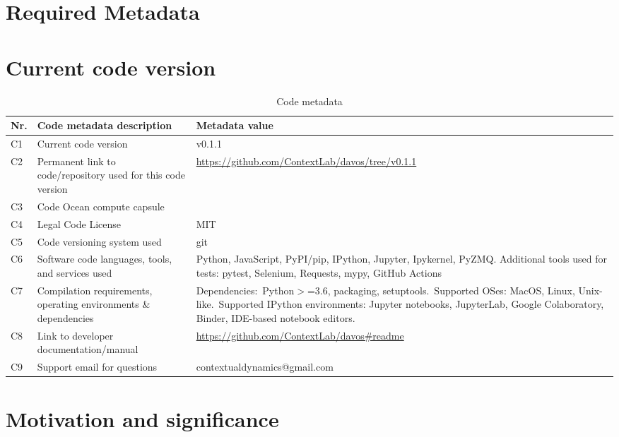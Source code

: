 \documentclass[preprint,12pt, a4paper]{elsarticle}
\begin{document}
\section*{Required Metadata}

\section*{Current code version}


\begin{table}[H]
\begin{tabular}{|l|p{6.5cm}|p{6.5cm}|}
\hline
\textbf{Nr.} & \textbf{Code metadata description} & \textbf{Metadata value} \\
\hline
C1 & Current code version &  v0.1.1 \\
\hline
C2 & Permanent link to code/repository used for this code version & \url{https://github.com/ContextLab/davos/tree/v0.1.1} \\
\hline
C3 & Code Ocean compute capsule & \\
\hline
C4 & Legal Code License & MIT \\
\hline
C5 & Code versioning system used & git \\
\hline
C6 & Software code languages, tools, and services used & Python, JavaScript, PyPI/pip, IPython, Jupyter, Ipykernel, PyZMQ. Additional tools used for tests: pytest, Selenium, Requests, mypy, GitHub Actions \\
\hline
C7 & Compilation requirements, operating environments \& dependencies & Dependencies:~Python$>$=3.6, packaging, setuptools.~Supported OSes: MacOS, Linux, Unix-like.~Supported IPython environments: Jupyter notebooks, JupyterLab, Google Colaboratory, Binder, IDE-based notebook editors. \\
\hline
C8 & Link to developer documentation/manual & \url{https://github.com/ContextLab/davos\#readme} \\
\hline
C9 & Support email for questions & contextualdynamics@gmail.com \\
\hline
\end{tabular}
\caption{Code metadata}
\label{}
\end{table}

\linenumbers


\section{Motivation and significance}
\end{document}
